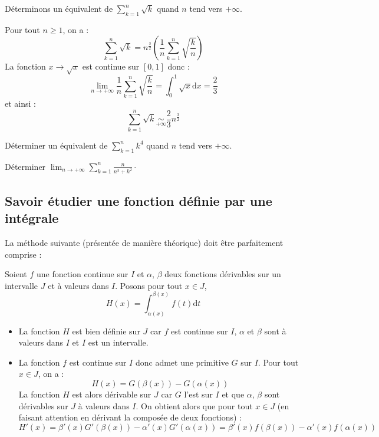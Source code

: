 \documentclass[french,11pt,twoside]{VcCours}
\newcommand{\dx}{\text{d}x}
\newcommand{\dt}{\text{d}t}
\newcommand{\Sum}[2]{\sum_{#1}^{#2}}
\begin{document}
\begin{Exemple} Déterminons un équivalent de $\Sum{k=1}{n} \sqrt{k}$ quand $n$ tend vers $+ \infty$.

Pour tout $n \geq 1$, on a :
$$ \sum_{k=1}^{n} \sqrt{k} = n^{\frac{3}{2}} \left( \frac{1}{n} \sum_{k=1}^n \sqrt{\frac{k}{n}} \right)$$
La fonction $x \rightarrow \sqrt{x}$ est continue sur $[0,1]$ donc :
$$ \lim_{n \rightarrow + \infty} \frac{1}{n} \sum_{k=1}^n \sqrt{\frac{k}{n}} = \int_{0}^1 \sqrt{x} \dx =  \frac{2}{3}$$
et ainsi :
$$ \sum_{k=1}^{n} \sqrt{k} \underset{+ \infty}{\sim}  \frac{2}{3} n^{\frac{3}{2}}$$
\end{Exemple}

\begin{ApplicationDirecte}{} Déterminer un équivalent de $\Sum{k=1}{n} k^4$ quand $n$ tend vers $+ \infty$.
\end{ApplicationDirecte}

\begin{ApplicationDirecte}{} Déterminer $\lim_{n \rightarrow + \infty} \sum_{k = 1}^{n} \frac{n}{n^{2} + k^{2}} \cdot$
\end{ApplicationDirecte}

\subsection{Savoir étudier une fonction définie par une intégrale}

La méthode suivante (présentée de manière théorique) doit être parfaitement comprise :

\medskip

Soient $f$ une fonction continue sur $I$ et $\alpha$, $\beta$ deux fonctions dérivables sur un intervalle $J$ et à valeurs dans $I$. Posons pour tout $x \in J$,
$$H(x) = \int_{\alpha(x)}^{\beta(x)} f(t) \dt$$
%
\begin{itemize}
\item La fonction $H$ est bien définie sur $J$ car $f$ est continue sur $I$, $\alpha$ et $\beta$ sont à valeurs dans $I$ et $I$ est un intervalle.
\item La fonction $f$ est continue sur $I$ donc admet une primitive $G$ sur $I$. Pour tout $x \in J$, on a :
$$ H(x) = G(\beta(x))- G(\alpha(x))$$
La fonction $H$ est alors dérivable sur $J$ car $G$ l'est sur $I$ et que $\alpha$, $\beta$ sont dérivables sur $J$ à valeurs dans $I$. On obtient alors que pour tout $x \in J$ (en faisant attention en dérivant la composée de deux fonctions) :
$$H'(x) =  \beta'(x) G'(\beta(x)) - \alpha'(x) G'(\alpha(x)) =   \beta'(x) f(\beta(x)) - \alpha'(x) f(\alpha(x))$$
\end{itemize}
\end{document}
